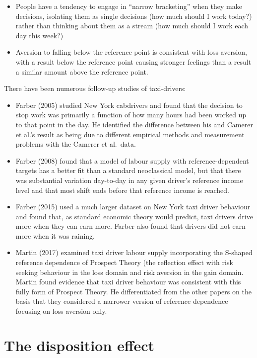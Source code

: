 \documentclass[
  letterpaper,
  DIV=11,
  numbers=noendperiod]{scrreprt}
\providecommand{\tightlist}{%
  \setlength{\itemsep}{0pt}\setlength{\parskip}{0pt}}\usepackage{longtable,booktabs,array}
\begin{document}
\begin{itemize}
\tightlist
\item
  People have a tendency to engage in ``narrow bracketing'' when they
  make decisions, isolating them as single decisions (how much should I
  work today?) rather than thinking about them as a stream (how much
  should I work each day this week?)
\item
  Aversion to falling below the reference point is consistent with loss
  aversion, with a result below the reference point causing stronger
  feelings than a result a similar amount above the reference point.
\end{itemize}

There have been numerous follow-up studies of taxi-drivers:

\begin{itemize}
\item
  Farber (2005) studied New York cabdrivers and found that the decision
  to stop work was primarily a function of how many hours had been
  worked up to that point in the day. He identified the difference
  between his and Camerer et al.'s result as being due to different
  empirical methods and measurement problems with the Camerer et
  al.~data.
\item
  Farber (2008) found that a model of labour supply with
  reference-dependent targets has a better fit than a standard
  neoclassical model, but that there was substantial variation
  day-to-day in any given driver's reference income level and that most
  shift ends before that reference income is reached.
\item
  Farber (2015) used a much larger dataset on New York taxi driver
  behaviour and found that, as standard economic theory would predict,
  taxi drivers drive more when they can earn more. Farber also found
  that drivers did not earn more when it was raining.
\item
  Martin (2017) examined taxi driver labour supply incorporating the
  S-shaped reference dependence of Prospect Theory (the reflection
  effect with risk seeking behaviour in the loss domain and risk
  aversion in the gain domain. Martin found evidence that taxi driver
  behaviour was consistent with this fully form of Prospect Theory. He
  differentiated from the other papers on the basis that they considered
  a narrower version of reference dependence focusing on loss aversion
  only.
\end{itemize}

\hypertarget{the-disposition-effect}{%
\section{The disposition effect}\label{the-disposition-effect}}
\end{document}
